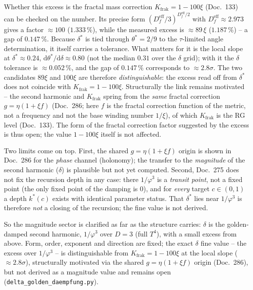 Whether this excess is the fractal mass correction $K_{\text{frak}}=1-100\xi$ (Doc.~133) can be
checked on the number. Its precise form
$(D_f^{\text{eff}}/3)^{D_f^{\text{eff}}/2}$ with $D_f^{\text{eff}}\approx2.973$ gives a factor
$\approx100$ ($1.333\,\%$), while the measured excess is $\approx89\,\xi$ ($1.187\,\%$) -- a gap of
$0.147\,\%$. Because $\delta^*$ is tied through $\theta^*=2/9$ to the $\tau$-limited angle
determination, it itself carries a tolerance. What matters for it is the local slope at
$\delta^*\approx0.24$, $\mathrm{d}\theta^*/\mathrm{d}\delta\approx0.80$ (not the median $0.31$ over
the $\delta$ grid); with it the $\delta$ tolerance is $\approx0.052\,\%$, and the gap of $0.147\,\%$
corresponds to $\approx2.8\sigma$. The two candidates $89\xi$ and $100\xi$ are therefore
\emph{distinguishable}: the excess read off from $\delta^*$ does not coincide with
$K_{\text{frak}}=1-100\xi$. Structurally the link remains motivated -- the second harmonic and
$K_{\text{frak}}$ spring from the \emph{same} fractal correction $g=\eta(1+\xi f)$ (Doc.~286; here $f$
is the fractal correction function of the metric, not a frequency and not the base winding number
$1/\xi$), of which $K_{\text{frak}}$ is the RG level (Doc.~133). The form of the fractal correction
factor suggested by the excess is thus open; the value $1-100\xi$ itself is not affected.

Two limits come on top. First, the shared $g=\eta(1+\xi f)$ origin is shown in Doc.~286 for the
\emph{phase} channel (holonomy); the transfer to the \emph{magnitude} of the second harmonic
($\delta$) is plausible but not yet computed. Second, Doc.~275 does not fix the recursion depth in
any case: there $1/\varphi^3$ is a \emph{transit point}, not a fixed point (the only fixed point of
the damping is $0$), and for \emph{every} target $c\in(0,1)$ a depth $k^*(c)$ exists with identical
parameter status. That $\delta^*$ lies near $1/\varphi^3$ is therefore \emph{not} a closing of the
recursion; the fine value is not derived.

So the magnitude sector is clarified as far as the structure carries: $\delta$ is the
golden-damped second harmonic, $1/\varphi^3$ over $D=3$ (full $T^4$), with a small excess from
above. Form, order, exponent and direction are fixed; the exact $\delta$ fine value -- the excess
over $1/\varphi^3$ -- is distinguishable from $K_{\text{frak}}=1-100\xi$ at the local slope
($\approx2.8\sigma$), structurally motivated via the shared $g=\eta(1+\xi f)$ origin (Doc.~286), but
not derived as a magnitude value and remains open (\texttt{delta\_golden\_daempfung.py}).

